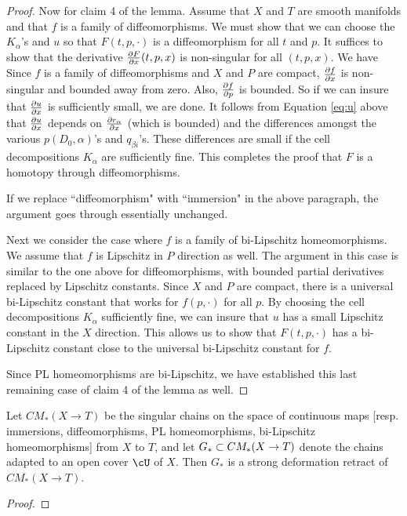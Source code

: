 \begin{proof}
Now for claim 4 of the lemma.
Assume that $X$ and $T$ are smooth manifolds and that $f$ is a family of diffeomorphisms.
We must show that we can choose the $K_\alpha$'s and $u$ so that $F(t, p, \cdot)$ is a 
diffeomorphism for all $t$ and $p$.
It suffices to 
show that the derivative $\frac{\partial F}{\partial x}(t, p, x)$ is non-singular for all $(t, p, x)$.
We have
Since $f$ is a family of diffeomorphisms and $X$ and $P$ are compact, 
$\frac{\partial f}{\partial x}$ is non-singular and bounded away from zero.
Also, $\frac{\partial f}{\partial p}$ is bounded.
So if we can insure that $\frac{\partial u}{\partial x}$ is sufficiently small, we are done.
It follows from Equation \eqref{eq:u} above that $\frac{\partial u}{\partial x}$ depends on $\frac{\partial r_\alpha}{\partial x}$
(which is bounded)
and the differences amongst the various $p(D_0,\alpha)$'s and $q_{\beta i}$'s.
These differences are small if the cell decompositions $K_\alpha$ are sufficiently fine.
This completes the proof that $F$ is a homotopy through diffeomorphisms.

If we replace ``diffeomorphism" with ``immersion" in the above paragraph, the argument goes
through essentially unchanged.

Next we consider the case where $f$ is a family of bi-Lipschitz homeomorphisms.
We assume that $f$ is Lipschitz in $P$ direction as well.
The argument in this case is similar to the one above for diffeomorphisms, with
bounded partial derivatives replaced by Lipschitz constants.
Since $X$ and $P$ are compact, there is a universal bi-Lipschitz constant that works for 
$f(p, \cdot)$ for all $p$.
By choosing the cell decompositions $K_\alpha$ sufficiently fine,
we can insure that $u$ has a small Lipschitz constant in the $X$ direction.
This allows us to show that $F(t, p, \cdot)$ has a bi-Lipschitz constant
close to the universal bi-Lipschitz constant for $f$.

Since PL homeomorphisms are bi-Lipschitz, we have established this last remaining case of claim 4 of the lemma as well.
\end{proof}

\begin{lemma}
Let $CM_*(X\to T)$ be the singular chains on the space of continuous maps
[resp. immersions, diffeomorphisms, PL homeomorphisms, bi-Lipschitz homeomorphisms]
from $X$ to $T$, and let $G_*\subset CM_*(X\to T)$ denote the chains adapted to an open cover $\cU$
of $X$.
Then $G_*$ is a strong deformation retract of $CM_*(X\to T)$.
\end{lemma}
\begin{proof}
\end{proof}

